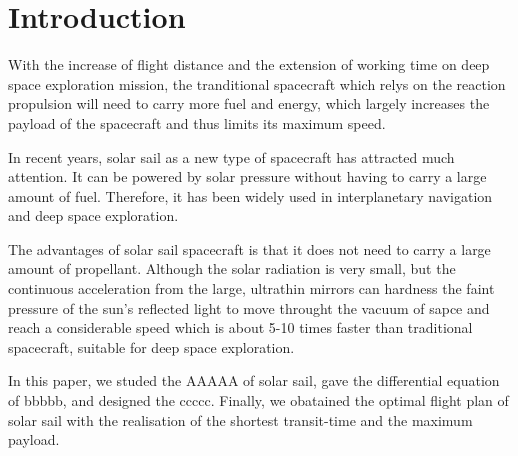 \documentclass[../Paper.tex]{subfiles}
\begin{document}
\section{Introduction}	


With the increase of flight distance and the extension of working time on deep space exploration mission, the tranditional spacecraft which relys on the reaction propulsion will need to carry more fuel and energy, which largely increases the payload of the spacecraft and thus limits its maximum speed.            

In recent years, solar sail as a new type of spacecraft has attracted much attention. It can be powered by solar pressure without having to carry a large amount of fuel. Therefore, it has been widely used in interplanetary navigation and deep space exploration. 


The advantages of solar sail spacecraft is that it does not need to carry a large amount of propellant. Although the solar radiation is very small, but the continuous acceleration from the large, ultrathin mirrors can hardness the faint pressure of the sun's reflected light to move throught the vacuum of sapce and reach a considerable speed which is about 5-10 times faster than traditional spacecraft, suitable for deep space exploration.            

In this paper, we studed the AAAAA of solar sail, gave the differential equation of bbbbb, and designed the ccccc. Finally, we obatained the optimal flight plan of solar sail with the realisation of the shortest transit-time and the maximum payload. 
\end{document}
